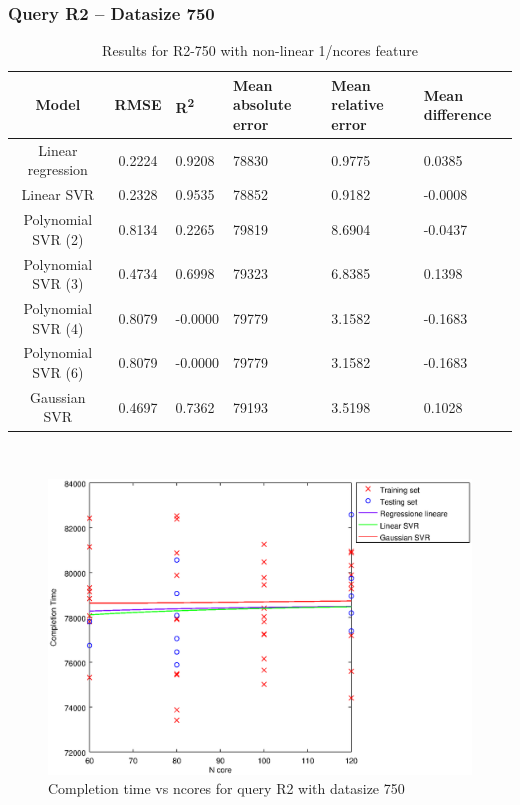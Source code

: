 \documentclass[a4paper,11pt]{article}
\begin{document}
\newpage
\subsubsection{Query R2 -- Datasize 750}
\begin{table}[H]
	\centering
	\begin{adjustbox}{center}
		\begin{tabular}{c | c M{1.2cm} M{2.5cm} M{2.5cm} M{1.8cm}}
			Model & RMSE & R\textsuperscript{2} & Mean absolute error & Mean relative error & Mean difference \tabularnewline
			\hline
			Linear regression & 0.2224 & 0.9208 &  78830 & 0.9775 & 0.0385 \\
			Linear SVR & 0.2328 & 0.9535 &  78852 & 0.9182 & -0.0008 \\
			Polynomial SVR (2) & 0.8134 & 0.2265 &  79819 & 8.6904 & -0.0437 \\
			Polynomial SVR (3) & 0.4734 & 0.6998 &  79323 & 6.8385 & 0.1398 \\
			Polynomial SVR (4) & 0.8079 & -0.0000 &  79779 & 3.1582 & -0.1683 \\
			Polynomial SVR (6) & 0.8079 & -0.0000 &  79779 & 3.1582 & -0.1683 \\
			Gaussian SVR & 0.4697 & 0.7362 &  79193 & 3.5198 & 0.1028 \\
		\end{tabular}
	\end{adjustbox}
	\\
	\caption{Results for R2-750 with non-linear 1/ncores feature}
	\label{table_R2_prediction_all}
\end{table}

\begin {figure}[hbtp]
\centering
\includegraphics[width=\textwidth]{output/R2_750_1_OVER_NCORES/plot_R2_750_bestmodels.eps}
\caption {Completion time vs ncores for query R2 with datasize 750}
\end {figure}
\end{document}
